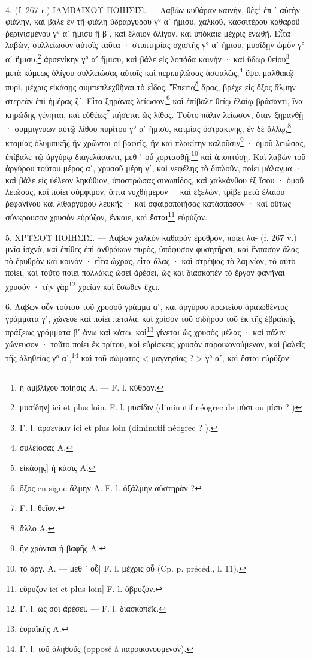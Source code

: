 \documentclass[a4paper, 11pt, oneside, polutonikogreek, french]{article}
\begin{document}
4. (f. 267 r.) ΙΑΜΒΛΙΧΟΥ ΠΟΙΗΣΙΣ. --- Λαβὼν κυθάραν καινὴν, θὲς\footnote{ἡ ἀμβλίχου ποίησις A. --- F. l. κύθραν.} ἐπ ᾽ αὐτὴν φιάλην, καὶ βάλε ἐν τῇ φιάλῃ ὑδραργύρου γ° αʹ ἥμισυ, χαλκοῦ, κασσιτέρου καθαροῦ ῥερινισμένου γ° αʹ ἥμισυ ἢ βʹ, καὶ ἔλαιον ὀλίγον, καὶ ὑπόκαιε μέχρις ἑνωθῇ. Εἶτα λαβὼν, συλλείωσον αὐτοῖς ταῦτα · στυπτηρίας σχιστῆς γ° αʹ ἥμισυ, μυσίδῃν ὠμὸν γ° αʹ ἥμισυ,\footnote{μυσίδην] ici et plus loin. F. l. μυσίδιν (diminutif néogrec de μύσι ou μίσυ ? )} ἀρσενίκην γ° αʹ ἥμισυ, καὶ βάλε εἰς λοπάδα καινήν · καὶ ὕδωρ θείου\footnote{F. l. ἀρσενίκιν ici et plus loin (diminutif néogrec ? ).} μετὰ κόμεως ὀλίγου συλλειώσας αὐτοῖς καὶ περιπηλώσας ἀσφαλῶς,\footnote{συλείοσας A.} ἕψει μαλθακῷ πυρὶ, μέχρις εἰκάσῃς συμπεπλεχθῆναι τὸ εἶδος. Ἔπειτα\footnote{εἰκάσῃς] ἡ κάσις A.} ἄρας, βρέχε εἰς ὄξος ἅλμην στερεὰν ἐπὶ ἡμέρας ζʹ. Εἶτα ξηράνας λείωσον,\footnote{ὄξος en signe ἅλμην A. F. l. ὀξάλμην αὐστηρὰν ?} καὶ ἐπίβαλε θείῳ ἐλαίῳ βράσαντι, ἵνα κηρώδης γένηται, καὶ εὐθέως\footnote{F. l. θεῖον.} πήσεται ὡς λίθος. Τοῦτο πάλιν λείωσον, ὅταν ξηρανθῇ · συμμιγνύων αὐτῷ λίθου πυρίτου γ° αʹ ἥμισυ, κατμίας ὀστρακίνης, ἐν δὲ ἄλλῳ,\footnote{ἄλλο A.} κταμίας ὀλυμπικῆς ἣν χρῶνται οἱ βαφεῖς, ἣν καὶ πλακίτην καλοῦσιν\footnote{ἢν χρόνται ἡ βαφῆς A.} · ὁμοῦ λειώσας, ἐπίβαλε τῷ ἀργύρῳ διαγελάσαντι, μεθ ᾽ οὗ χορτασθῇ,\footnote{τὸ ἀργ. A. --- μεθ ᾽ οὗ] F. l. μέχρις οὗ (Cp. p. précéd., l. 11).} καὶ ἀποπτύσῃ. Καὶ λαβὼν τοῦ ἀργύρου τούτου μέρος αʹ, χρυσοῦ μέρη γʹ, καὶ νεφέλης τὸ διπλοῦν, ποίει μάλαγμα · καὶ βάλε εἰς ὑέλεον ληκύθιον, ὑποστρώσας σινωπίδος, καὶ χαλκάνθου ἐξ ἴσου · ὁμοῦ λειώσας, καὶ ποίει σύμφιμον, ὄπτα νυχθήμερον · καὶ ἐξελὼν, τρίβε μετὰ ἐλαίου ῥεφανίνου καὶ λιθαργύρου λευκῆς · καὶ σφαιροποιήσας κατάσπασον · καὶ οὕτως σύνκρουσον χρυσὸν εὑρύζον, ἔνκαιε, καὶ ἔσται\footnote{εὕρυζον ici et plus loin] F. l. ὄβρυζον.} εὑρύζον.

5. ΧΡΥΣΟΥ ΠΟΙΗΣΙΣ. --- Λαβὼν χαλκὸν καθαρὸν ἐρυθρὸν, ποίει λα- (f. 267 v.) μνία ἰσχνὰ, καὶ ἐπίθες ἐπὶ ἀνθράκων πυρὸς, ὑπόφυσον φυσητῆρσι, καὶ ἔνπασον ἅλας τὸ ἐρυθρὸν καὶ κοινόν · εἶτα ὤχρας, εἶτα ἅλας · καὶ στρέψας τὸ λαμνίον, τὸ αὐτὸ ποίει, καὶ τοῦτο ποίει πολλάκις ὡσεὶ ἀρέσει, ὡς καὶ διασκοπὲν τὸ ἔργον φανῆναι χρυσόν · τὴν γὰρ\footnote{F. l. ὥς σοι ἀρέσει. --- F. l. διασκοπεῖς.} χρείαν καὶ ἔσωθεν ἔχει.

6. Λαβὼν οὖν τούτου τοῦ χρυσοῦ γράμμα αʹ, καὶ ἀργύρου πρωτείου ἀραιωθέντος γράμματα γʹ, χώνευε καὶ ποίει πέταλα, καὶ χρίσον τοῦ σιδήρου τοῦ ἐκ τῆς ἑβραϊκῆς πράξεως γράμματα βʹ ἄνω καὶ κάτω, καὶ\footnote{ἐυραϊκῆς A.} γίνεται ὡς χρυσὸς μέλας · καὶ πάλιν χώνευσον · τοῦτο ποίει ἐκ τρίτου, καὶ εὑρίσκεις χρυσὸν παροικονούμενον, καὶ βαλεῖς τῆς ἀληθείας γ° αʹ,\footnote{F. l. τοῦ ἀληθοῦς (opposé à παροικονούμενον).} καὶ τοῦ σώματος < μαγνησίας ? > γ° αʹ, καὶ ἔσται εὐρύζον.
\end{document}
